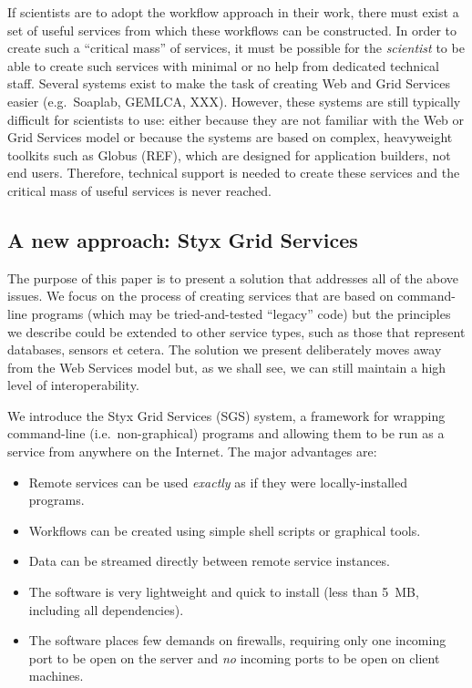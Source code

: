 \documentclass{llncs}
\begin{document}
If scientists are to adopt the workflow approach in their work, there must exist a set of useful services from which these workflows can be constructed.  In order to create such a ``critical mass'' of services, it must be possible for the {\em scientist\/} to be able to create such services with minimal or no help from dedicated technical staff.  Several systems exist to make the task of creating Web and Grid Services easier (e.g.\ Soaplab, GEMLCA, XXX).  However, these systems are still typically difficult for scientists to use: either because they are not familiar with the Web or Grid Services model or because the systems are based on complex, heavyweight toolkits such as Globus (REF), which are designed for application builders, not end users.  Therefore, technical support is needed to create these services and the critical mass of useful services is never reached.

\subsection{A new approach: Styx Grid Services}
The purpose of this paper is to present a solution that addresses all of the above issues.  We focus on the process of creating services that are based on command-line programs (which may be tried-and-tested ``legacy'' code) but the principles we describe could be extended to other service types, such as those that represent databases, sensors et cetera.  The solution we present deliberately moves away from the Web Services model but, as we shall see, we can still maintain a high level of interoperability.

We introduce the Styx Grid Services (SGS) system, a framework for wrapping command-line (i.e.\ non-graphical) programs and allowing them to be run as a service from anywhere on the Internet.  The major advantages are:
\begin{itemize}
	\item Remote services can be used {\em exactly\/} as if they were locally-installed programs.
	\item Workflows can be created using simple shell scripts or graphical tools.
	\item Data can be streamed directly between remote service instances.
	\item The software is very lightweight and quick to install (less than 5~MB, including all dependencies).
	\item The software places few demands on firewalls, requiring only one incoming port to be open on the server and {\em no\/} incoming ports to be open on client machines.
\end{itemize}
\end{document}
